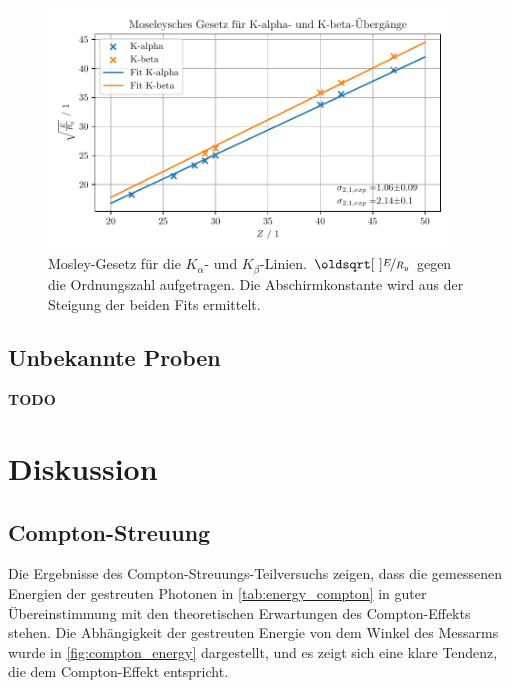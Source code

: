 \documentclass[ngerman]{scrartcl}
\begin{document}
\begin{figure}[H]
    \centering
    \begin{samepage}
        \includegraphics[width=0.95\textwidth]{../plots/roentgen_data_Z_vs_E.pdf} 
        \caption[Mosley-Gesetz für die $K_{\alpha}$- und $K_{\beta}$-Linien.]{Mosley-Gesetz für die $K_{\alpha}$- und $K_{\beta}$-Linien. $\sqrt{\nicefrac{E}{R_y}}$ gegen die Ordnungszahl aufgetragen. Die Abschirmkonstante wird aus der Steigung der beiden Fits ermittelt.}
        \label{fig:roentgen_z_vs_e}
    \end{samepage}
\end{figure}
\subsection{Unbekannte Proben}
\label{sec:roentgen_unbekannt}
\textbf{TODO}
\section{Diskussion}
\label{sec:diskussion}
\subsection{Compton-Streuung}
\label{sec:diskussion_compton}
Die Ergebnisse des Compton-Streuungs-Teilversuchs zeigen, dass die gemessenen Energien der gestreuten Photonen in \autoref{tab:energy_compton} in guter Übereinstimmung mit den theoretischen Erwartungen des Compton-Effekts stehen. Die Abhängigkeit der gestreuten Energie von dem Winkel des Messarms wurde in \autoref{fig:compton_energy} dargestellt, und es zeigt sich eine klare Tendenz, die dem Compton-Effekt entspricht.
\end{document}
